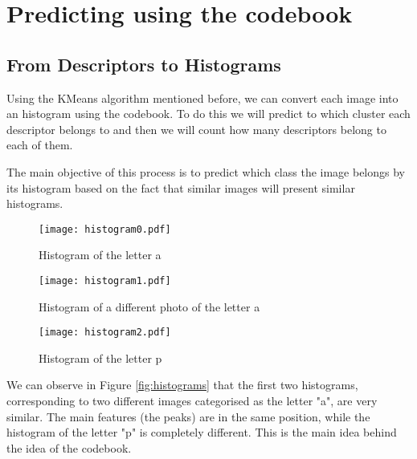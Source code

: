\documentclass[9pt,a4paper,twoside]{tau-class/tau}
\begin{document}
\section{Predicting using the codebook}

    \subsection{From Descriptors to Histograms}
        Using the KMeans algorithm mentioned before, we can convert each image into an histogram using the codebook.
        To do this we will predict to which cluster each descriptor belongs to and then we will count how many descriptors 
        belong to each of them.

        The main objective of this process is to predict which class the image belongs by its histogram based on the fact that similar images will
        present similar histograms.

        \begin{figure*}[t] %
            \centering
            \begin{subfigure}[b]{0.2\linewidth} %
                \texttt{[image: histogram0.pdf]} %
                \caption{Histogram of the letter a}
                \label{fig:hista}
            \end{subfigure}
                \hspace{20pt}   %
            \begin{subfigure}[b]{0.2\linewidth} %
                \texttt{[image: histogram1.pdf]}
                \caption{Histogram of a different photo of the letter a}
                \label{fig:histb}
            \end{subfigure}
                \hspace{20pt} 
            \begin{subfigure}[b]{0.2\linewidth} %
                \texttt{[image: histogram2.pdf]}
                \caption{Histogram of the letter p}
                \label{fig:histc}            
            \end{subfigure}
            \caption{Comparison of histograms of different images}
            \label{fig:histograms}
        \end{figure*}
		
	We can observe in Figure \ref{fig:histograms} that the first two histograms, corresponding to two different images categorised as the letter "a", are very similar.
    The main features (the peaks) are in the same position, while the histogram of the letter "p" is completely different. This is the main idea behind the idea of the codebook.
    
\end{document}

